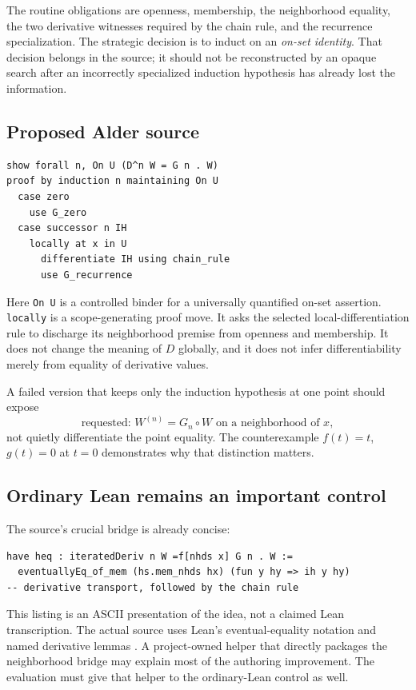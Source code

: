 \documentclass[11pt,a4paper]{article}
\newcommand{\code}[1]{\nolinkurl{#1}}
\theoremstyle{plain}
\theoremstyle{definition}
\theoremstyle{remark}
\begin{document}
The routine obligations are openness, membership, the neighborhood equality, the two derivative witnesses required by the chain rule, and the recurrence specialization. The strategic decision is to induct on an \emph{on-set identity}. That decision belongs in the source; it should not be reconstructed by an opaque search after an incorrectly specialized induction hypothesis has already lost the information.

\subsection{Proposed Alder source}
\Needspace{156pt}
\begin{lstlisting}
show forall n, On U (D^n W = G n . W)
proof by induction n maintaining On U
  case zero
    use G_zero
  case successor n IH
    locally at x in U
      differentiate IH using chain_rule
      use G_recurrence
\end{lstlisting}
Here \code{On U} is a controlled binder for a universally quantified on-set assertion. \code{locally} is a scope-generating proof move. It asks the selected local-differentiation rule to discharge its neighborhood premise from openness and membership. It does not change the meaning of $D$ globally, and it does not infer differentiability merely from equality of derivative values.

A failed version that keeps only the induction hypothesis at one point should expose
\[
 \text{requested: }W^{(n)}=G_n\circ W\text{ on a neighborhood of }x,
\]
not quietly differentiate the point equality. The counterexample $f(t)=t$, $g(t)=0$ at $t=0$ demonstrates why that distinction matters.

\subsection{Ordinary Lean remains an important control}
The source's crucial bridge is already concise:
\Needspace{86pt}
\begin{lstlisting}
have heq : iteratedDeriv n W =f[nhds x] G n . W :=
  eventuallyEq_of_mem (hs.mem_nhds hx) (fun y hy => ih y hy)
-- derivative transport, followed by the chain rule
\end{lstlisting}
This listing is an ASCII presentation of the idea, not a claimed Lean transcription. The actual source uses Lean's eventual-equality notation and named derivative lemmas \cite{autonomous}. A project-owned helper that directly packages the neighborhood bridge may explain most of the authoring improvement. The evaluation must give that helper to the ordinary-Lean control as well.
\end{document}
